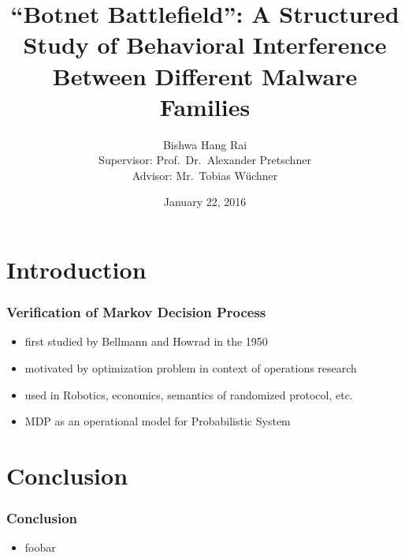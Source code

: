 \documentclass[]{beamer}
\title{``Botnet Battlefield'': A Structured Study of Behavioral Interference Between Different Malware Families}
\author[Bishwa Hang Rai]{
Bishwa Hang Rai
\\{\small Supervisor: Prof.\ Dr.\ Alexander Pretschner}
\\{\small Advisor: Mr.\ Tobias Wüchner}}
\institute{\texttt{[image: logos/tum.png]}~\\[1cm]Department of Informatics\\
TU München}
\date{January 22, 2016}
\begin{document}
\begin{frame}
\begin{titlepage}
\end{titlepage}
\end{frame}
\section{Introduction}
\begin{frame}
\frametitle{ Verification of Markov Decision Process}
\begin{itemize}
\item first studied by Bellmann and Howrad in the 1950
\item motivated by optimization problem in context of operations research
\item used in Robotics, economics, semantics of randomized protocol, etc.
\item MDP as an operational model for Probabilistic System
\end{itemize}
\end{frame}

\section{Conclusion}
\begin{frame}
\frametitle{Conclusion}
\begin{itemize}
    \item foobar
\end{itemize}
\end{frame}
\end{document}
